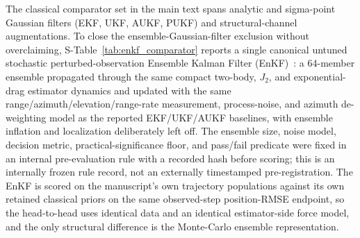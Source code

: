 \documentclass{article}
\begin{document}
The classical comparator set in the main text spans analytic and sigma-point Gaussian filters (EKF, UKF, AUKF, PUKF) and structural-channel augmentations. To close the ensemble-Gaussian-filter exclusion without overclaiming, S-Table~\ref{tab:enkf_comparator} reports a single canonical untuned stochastic perturbed-observation Ensemble Kalman Filter (EnKF)~\cite{evensen1994sequential,burgers1998analysis}: a 64-member ensemble propagated through the same compact two-body, $J_2$, and exponential-drag estimator dynamics and updated with the same range/azimuth/elevation/range-rate measurement, process-noise, and azimuth de-weighting model as the reported EKF/UKF/AUKF baselines, with ensemble inflation and localization deliberately left off. The ensemble size, noise model, decision metric, practical-significance floor, and pass/fail predicate were fixed in an internal pre-evaluation rule with a recorded hash before scoring; this is an internally frozen rule record, not an externally timestamped pre-registration. The EnKF is scored on the manuscript's own trajectory populations against its own retained classical priors on the same observed-step position-RMSE endpoint, so the head-to-head uses identical data and an identical estimator-side force model, and the only structural difference is the Monte-Carlo ensemble representation.
\end{document}
